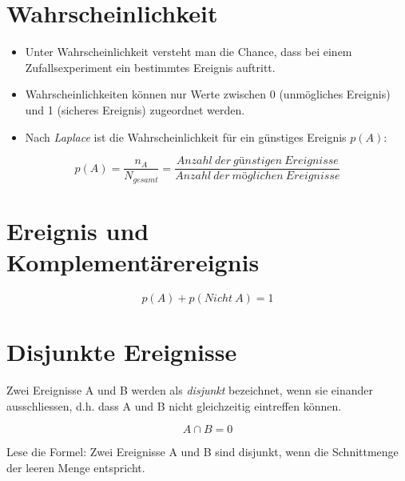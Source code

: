 \documentclass[
]{book}
\providecommand{\tightlist}{%
  \setlength{\itemsep}{0pt}\setlength{\parskip}{0pt}}
\begin{document}
\hypertarget{wahrscheinlichkeit}{%
\section{Wahrscheinlichkeit}\label{wahrscheinlichkeit}}

\begin{itemize}
\tightlist
\item
  Unter Wahrscheinlichkeit versteht man die Chance, dass bei einem Zufallsexperiment ein bestimmtes Ereignis auftritt.\\
\item
  Wahrscheinlichkeiten können nur Werte zwischen 0 (unmögliches Ereignis) und 1 (sicheres Ereignis) zugeordnet werden.\\
\item
  Nach \emph{Laplace} ist die Wahrscheinlichkeit für ein günstiges Ereignis \(p(A)\):
\end{itemize}

\begin{equation}
  p(A) = \frac{n_A}{N_{gesamt}} = \frac{Anzahl~der~günstigen~Ereignisse}{Anzahl~der~möglichen~Ereignisse}
  \label{eq:prob-p}
\end{equation}

\hypertarget{ereignis-und-komplementuxe4rereignis}{%
\section{Ereignis und Komplementärereignis}\label{ereignis-und-komplementuxe4rereignis}}

\begin{equation}
  p(A) + p(Nicht~A) = 1
  \label{eq:prob-p-q}
\end{equation}

\hypertarget{disjunkte-ereignisse}{%
\section{Disjunkte Ereignisse}\label{disjunkte-ereignisse}}

Zwei Ereignisse A und B werden als \emph{disjunkt} bezeichnet, wenn sie einander ausschliessen, d.h. dass A und B nicht gleichzeitig eintreffen können.

\begin{equation}
  A \cap B = 0
  \label{eq:disjoint}
\end{equation}

Lese die Formel: Zwei Ereignisse A und B sind disjunkt, wenn die Schnittmenge der leeren Menge entspricht.
\end{document}
